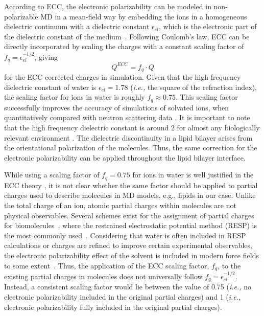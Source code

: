 \documentclass[aip,jcp,twocolumn]{revtex4}
\begin{document}
According to ECC, the electronic polarizability can be modeled in non-polarizable MD in a mean-field way by 
embedding the ions in a homogeneous dielectric continuum with a dielectric constant $\epsilon_{el}$, which is the electronic part of the dielectric constant of the medium~\cite{leontyev11}. Following Coulomb's law,  ECC can be directly incorporated by scaling the charges with a constant scaling factor of $f_q = \epsilon _{el} ^{-1/2}$, giving
\begin{equation}
Q^{ECC} = f_q \cdot Q
\end{equation}
for the ECC corrected charges in simulation. 
Given that the  high frequency dielectric constant of water is $\epsilon _{el} = 1.78$ (\textit{i.e.,} the square of the refraction index), the scaling factor for ions in water is roughly $f_q \approx 0.75$. This scaling factor successfully improves the accuracy of simulations of solvated ions, when quantitatively compared with neutron scattering data \cite{kohagen14,kohagen16, Pluharova2014, martinek17}.
It is important to note that the 
high frequency dielectric constant 
is around 2 for almost any biologically relevant environment \cite{leontyev11}.
The dielectric discontinuity in a lipid bilayer arises
from the orientational polarization of the molecules. 
Thus, the same correction for the electronic polarizability can be 
applied throughout the lipid bilayer interface.



While using a scaling factor of $f_q = 0.75$ for ions in water is well justified in the ECC theory \cite{leontyev11}, it is not clear whether the same factor should be applied to partial charges used to describe molecules in MD models, e.g., lipids in our case. Unlike the total charge of an ion, atomic partial charges within molecules are not physical observables. Several schemes exist for the assignment of partial charges for biomolecules~\cite{Hu2007}, where the restrained electrostatic potential method (RESP) is the most commonly used~\cite{RESP_paper, Singh1984}. Considering that water is often included in RESP calculations or charges are refined to improve certain experimental observables, the electronic polarizability effect of the solvent is included in modern force fields to some extent~\cite{RESP_paper, Singh1984, jorgensen96, ipolq2013, benavides17}. Thus, the application of the ECC scaling factor, $f_q$, to the existing partial charges in molecules does not universally follow $f_q = \epsilon _{el} ^{-1/2}$. Instead, a consistent scaling factor would lie between the value of 0.75  (\textit{i.e.,} no electronic polarizability included in the original partial charges) and 1 (\textit{i.e.,} electronic polarizability fully included in the original partial charges). 
\end{document}
